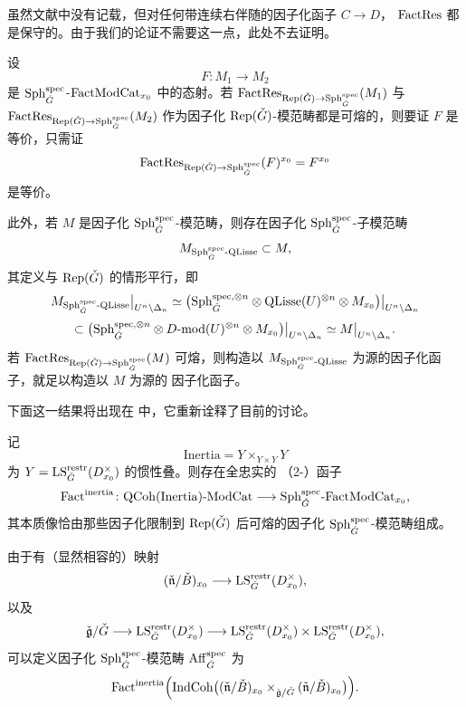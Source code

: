 \begin{remark}\label{rem:3.3.1.3}
虽然文献中没有记载，但对任何带连续右伴随的因子化函子 $C\to D$，
$\mathrm{FactRes}$ 都是保守的。由于我们的论证不需要这一点，此处不去证明。
\end{remark}

设
\[
F\colon M_1\longrightarrow M_2
\]
是 $\mathrm{Sph}^{\mathrm{spec}}_{\check G}$-$\mathrm{FactModCat}_{x_0}$ 中的态射。若
$\mathrm{FactRes}_{\mathrm{Rep}(\check G)\to \mathrm{Sph}^{\mathrm{spec}}_{\check G}}(M_1)$ 与
$\mathrm{FactRes}_{\mathrm{Rep}(\check G)\to \mathrm{Sph}^{\mathrm{spec}}_{\check G}}(M_2)$ 作为因子化
$\mathrm{Rep}(\check G)$-模范畴都是可熔的，则要证 $F$ 是等价，只需证
\[
\mathrm{FactRes}_{\mathrm{Rep}(\check G)\to \mathrm{Sph}^{\mathrm{spec}}_{\check G}}(F)^{x_0}=F^{x_0}
\]
是等价。

此外，若 $M$ 是因子化 $\mathrm{Sph}^{\mathrm{spec}}_{\check G}$-模范畴，则存在因子化
$\mathrm{Sph}^{\mathrm{spec}}_{\check G}$-子模范畴
\[
M_{\mathrm{Sph}^{\mathrm{spec}}_{\check G}\text{-}\mathrm{QLisse}}\subset M,
\]
其定义与 $\mathrm{Rep}(\check G)$ 的情形平行，即
\begin{equation}
M_{\mathrm{Sph}^{\mathrm{spec}}_{\check G}\text{-}\mathrm{QLisse}}\big|_{U^n\setminus\Delta_n}
\simeq
\bigl(\mathrm{Sph}^{\mathrm{spec},\otimes n}_{\check G}\otimes \mathrm{QLisse}(U)^{\otimes n}
\otimes M_{x_0}\bigr)\big|_{U^n\setminus\Delta_n}
\label{eq:3.3.3}
\end{equation}
\begin{equation}
\subset
\bigl(\mathrm{Sph}^{\mathrm{spec},\otimes n}_{\check G}\otimes D\text{-}\mathrm{mod}(U)^{\otimes n}
\otimes M_{x_0}\bigr)\big|_{U^n\setminus\Delta_n}
\simeq M\big|_{U^n\setminus\Delta_n}.
\label{eq:3.3.4}
\end{equation}
若 $\mathrm{FactRes}_{\mathrm{Rep}(\check G)\to \mathrm{Sph}^{\mathrm{spec}}_{\check G}}(M)$ 可熔，则构造以
$M_{\mathrm{Sph}^{\mathrm{spec}}_{\check G}\text{-}\mathrm{QLisse}}$ 为源的因子化函子，就足以构造以 $M$ 为源的
因子化函子。

下面这一结果将出现在 \cite{BCG26} 中，它重新诠释了目前的讨论。

\begin{proposition}\label{prop:3.3.1.4}
记
\[
\mathrm{Inertia}=Y\times_{Y\times Y}Y
\]
为 $Y=\mathrm{LS}^{\mathrm{restr}}_{\check G}(D^\times_{x_0})$ 的惯性叠。则存在全忠实的
（2-）函子
\[
\mathrm{Fact}^{\mathrm{inertia}}\colon
\mathrm{QCoh}(\mathrm{Inertia})\text{-}\mathrm{ModCat}\longrightarrow
\mathrm{Sph}^{\mathrm{spec}}_{\check G}\text{-}\mathrm{FactModCat}_{x_0},
\]
其本质像恰由那些因子化限制到 $\mathrm{Rep}(\check G)$ 后可熔的因子化
$\mathrm{Sph}^{\mathrm{spec}}_{\check G}$-模范畴组成。
\end{proposition}

\begin{definition}\label{def:aff-spec}
由于有（显然相容的）映射
\[
(\check{\mathfrak{n}}/\check B)_{x_0}\longrightarrow
\mathrm{LS}^{\mathrm{restr}}_{\check G}(D^\times_{x_0}),
\]
以及
\[
\check{\mathfrak{g}}/\check G\longrightarrow
\mathrm{LS}^{\mathrm{restr}}_{\check G}(D^\times_{x_0})\longrightarrow
\mathrm{LS}^{\mathrm{restr}}_{\check G}(D^\times_{x_0})\times
\mathrm{LS}^{\mathrm{restr}}_{\check G}(D^\times_{x_0}),
\]
可以定义因子化 $\mathrm{Sph}^{\mathrm{spec}}_{\check G}$-模范畴 $\mathrm{Aff}^{\mathrm{spec}}_{\check G}$ 为
\[
\mathrm{Fact}^{\mathrm{inertia}}
\Bigl(\mathrm{IndCoh}\bigl((\check{\mathfrak{n}}/\check B)_{x_0}
\times_{\check{\mathfrak{g}}/\check G}
(\check{\mathfrak{n}}/\check B)_{x_0}\bigr)\Bigr).
\]
\end{definition}

